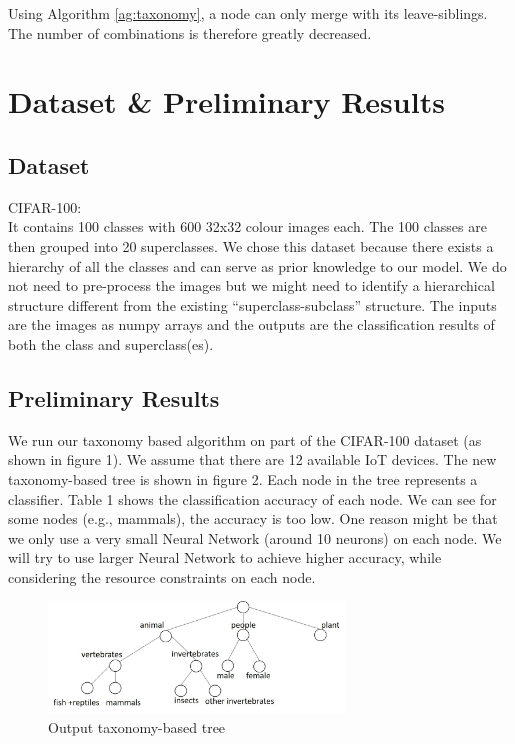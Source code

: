 \documentclass{article}
\begin{document}
Using Algorithm \ref{ag:taxonomy}, a node can only merge with its leave-siblings. The number of combinations is therefore greatly decreased.

\section{Dataset \& Preliminary Results}
\subsection{Dataset}
CIFAR-100:\\
It contains 100 classes with 600 32x32 colour images each. The 100 classes are then grouped into 20 superclasses. 
We chose this dataset because there exists a hierarchy of all the classes and can serve as prior knowledge to our model. 
We do not need to pre-process the images but we might need to identify a hierarchical structure different from the existing “superclass-subclass” structure. The inputs are the images as numpy arrays and the outputs are the classification results of both the class and superclass(es). 

\subsection{Preliminary Results}
We run our taxonomy based algorithm on part of the CIFAR-100 dataset (as shown in figure 1). We assume that there are 12 available IoT devices. The new taxonomy-based tree is shown in figure 2. Each node in the tree represents a classifier. Table 1 shows the classification accuracy of each node. We can see for some nodes (e.g., mammals), the accuracy is too low. One reason might be that we only use a very small Neural Network (around 10 neurons) on each node. We will try to use larger Neural Network to achieve higher accuracy, while considering the resource constraints on each node.

\begin{figure}[ht]
  \centering
  \includegraphics[width=0.7\textwidth]{fig2.jpg}
  \caption{Output taxonomy-based tree}
\end{figure}
\end{document}
